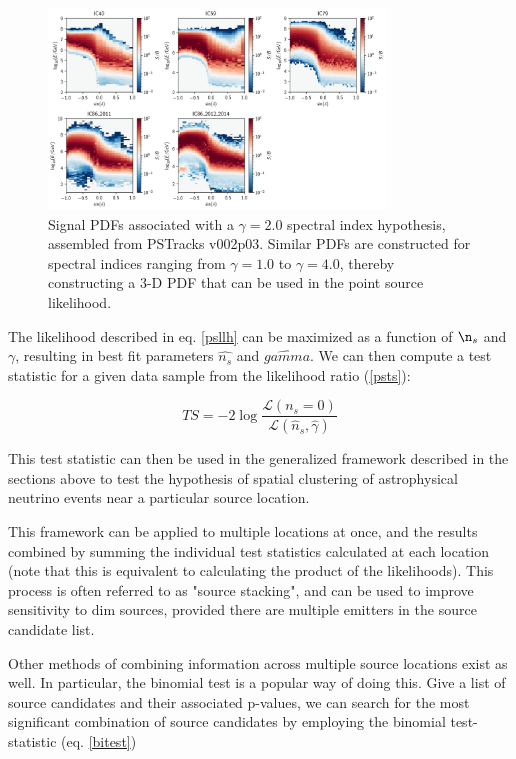 \begin{figure}[h]
\centering
\includegraphics[width=0.8\textwidth]{figs/sig_hists.png}
\caption{Signal PDFs associated with a $\gamma=2.0$ spectral index hypothesis, assembled from PSTracks v002p03. Similar PDFs are constructed for spectral indices ranging from $\gamma=1.0$ to $\gamma=4.0$, thereby constructing a 3-D PDF that can be used in the point source likelihood.}
\label{fig:SigPDf}
\end{figure}

The likelihood described in eq. \ref{psllh} can be maximized as a function of $\n_s$ and $\gamma$, resulting in best fit parameters $\hat{n_s}$ and $\hat{gamma}$. We can then compute a test statistic for a given data sample from the likelihood ratio (\ref{psts}):

\begin{equation}
    TS = -2 \log \frac{\mathcal{L}(n_s=0)}{\mathcal{L}(\hat{n}_s, \hat{\gamma})}
    \label{psts}
\end{equation}

This test statistic can then be used in the generalized framework described in the sections above to test the hypothesis of spatial clustering of astrophysical neutrino events near a particular source location. 

This framework can be applied to multiple locations at once, and the results combined by summing the individual test statistics calculated at each location (note that this is equivalent to calculating the product of the likelihoods). This process is often referred to as "source stacking", and can be used to improve sensitivity to dim sources, provided there are multiple emitters in the source candidate list. 

Other methods of combining information across multiple source locations exist as well. In particular, the binomial test is a popular way of doing this. Give a list of source candidates and their associated p-values, we can search for the most significant combination of source candidates by employing the binomial test-statistic (eq. \ref{bitest})

